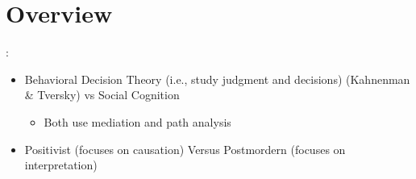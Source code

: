 \documentclass[
]{book}
\providecommand{\tightlist}{%
  \setlength{\itemsep}{0pt}\setlength{\parskip}{0pt}}
\begin{document}
\hypertarget{overview}{%
\section{Overview}\label{overview}}

\citep{simonson2001}:

\begin{itemize}
\item
  Behavioral Decision Theory (i.e., study judgment and decisions) (Kahnenman \& Tversky) vs Social Cognition

  \begin{itemize}
  \tightlist
  \item
    Both use mediation and path analysis
  \end{itemize}
\item
  Positivist (focuses on causation) Versus Postmordern (focuses on interpretation)
\end{itemize}
\end{document}
